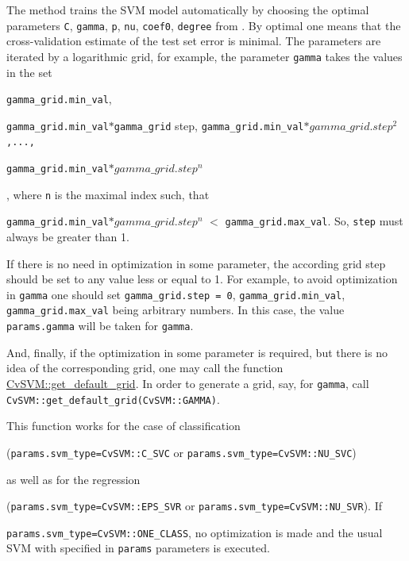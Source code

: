 \begin{description}
\end{description}

The method trains the SVM model automatically by choosing the optimal parameters \texttt{C}, \texttt{gamma}, \texttt{p}, \texttt{nu}, \texttt{coef0}, \texttt{degree} from . By optimal one means that the cross-validation estimate of the test set error is minimal. The parameters are iterated by a logarithmic grid, for example, the parameter \texttt{gamma} takes the values in the set {\texttt{gamma\_grid.min\_val}, 

\texttt{gamma\_grid.min\_val$*$gamma\_grid} step, \texttt{gamma\_grid.min\_val$*gamma\_grid.step^2$,...,} 

\texttt{gamma\_grid.min\_val$*gamma\_grid.step^n$}}, where \texttt{n} is the maximal index such, that 

\texttt{gamma\_grid.min\_val$*gamma\_grid.step^n$} $<$ \texttt{gamma\_grid.max\_val}. So, \texttt{step} must always be greater than 1.

If there is no need in optimization in some parameter, the according grid step should be set to any value less or equal to 1. For example, to avoid optimization in \texttt{gamma} one should set \texttt{gamma\_grid.step = 0}, \texttt{gamma\_grid.min\_val}, \texttt{gamma\_grid.max\_val} being arbitrary numbers. In this case, the value \texttt{params.gamma} will be taken for \texttt{gamma}.

And, finally, if the optimization in some parameter is required, but there is no idea of the corresponding grid, one may call the function \href{#CvSVM.3A.3Agetdefaultgrid}{CvSVM::get\_default\_grid}. In order to generate a grid, say, for \texttt{gamma}, call \texttt{CvSVM::get\_default\_grid(CvSVM::GAMMA)}.

This function works for the case of classification 

(\texttt{params.svm\_type=CvSVM::C\_SVC} or \texttt{params.svm\_type=CvSVM::NU\_SVC}) 

as well as for the regression 

(\texttt{params.svm\_type=CvSVM::EPS\_SVR} or \texttt{params.svm\_type=CvSVM::NU\_SVR}). If 

\texttt{params.svm\_type=CvSVM::ONE\_CLASS}, no optimization is made and the usual SVM with specified in \texttt{params} parameters is executed.


